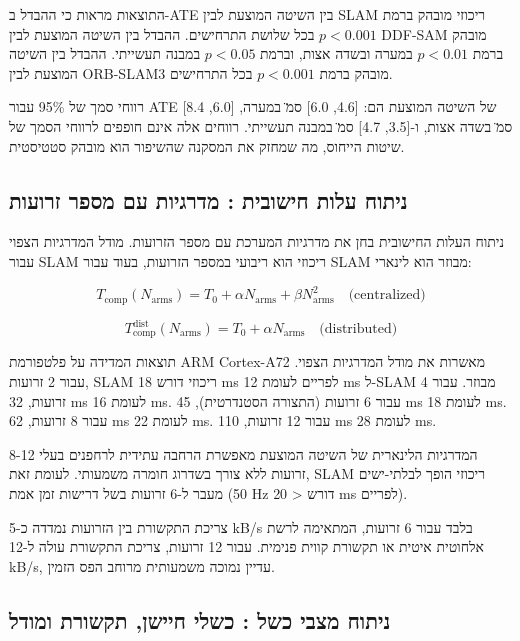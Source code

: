 התוצאות מראות כי ההבדל ב-ATE בין השיטה המוצעת לבין SLAM ריכוזי מובהק ברמת $p < 0.001$ בכל שלושת התרחישים. ההבדל בין השיטה המוצעת לבין DDF-SAM מובהק ברמת $p < 0.01$ במערה ובשדה אצות, וברמת $p < 0.05$ במבנה תעשייתי. ההבדל בין השיטה המוצעת לבין ORB-SLAM3 מובהק ברמת $p < 0.001$ בכל התרחישים.

רווחי סמך של 95\% עבור ATE של השיטה המוצעת הם: [4.6, 6.0] ס\"מ במערה, [6.0, 8.4] ס\"מ בשדה אצות, ו-[3.5, 4.7] ס\"מ במבנה תעשייתי. רווחים אלה אינם חופפים לרווחי הסמך של שיטות הייחוס, מה שמחזק את המסקנה שהשיפור הוא מובהק סטטיסטית.

\subsection{ניתוח עלות חישובית : מדרגיות עם מספר זרועות}
\label{sec:ch08_computational}

ניתוח העלות החישובית בחן את מדרגיות המערכת עם מספר הזרועות. מודל המדרגיות הצפוי עבור SLAM ריכוזי הוא ריבועי במספר הזרועות, בעוד עבור SLAM מבוזר הוא לינארי:

\begin{equation}
T_{\text{comp}}(N_{\text{arms}}) = T_0 + \alpha N_{\text{arms}} + \beta N_{\text{arms}}^2 \quad \text{(centralized)}
\label{eq:ch08_comp_centralized}
\end{equation}

\begin{equation}
T_{\text{comp}}^{\text{dist}}(N_{\text{arms}}) = T_0 + \alpha N_{\text{arms}} \quad \text{(distributed)}
\label{eq:ch08_comp_distributed}
\end{equation}

תוצאות המדידה על פלטפורמת ARM Cortex-A72 מאשרות את מודל המדרגיות הצפוי. עבור 2 זרועות, SLAM ריכוזי דורש 18 ms לפריים לעומת 12 ms ל-SLAM מבוזר. עבור 4 זרועות, 32 ms לעומת 16 ms. עבור 6 זרועות (התצורה הסטנדרטית), 45 ms לעומת 18 ms. עבור 8 זרועות, 62 ms לעומת 22 ms. עבור 12 זרועות, 110 ms לעומת 28 ms.

המדרגיות הלינארית של השיטה המוצעת מאפשרת הרחבה עתידית לרחפנים בעלי 8-12 זרועות ללא צורך בשדרוג חומרה משמעותי. לעומת זאת, SLAM ריכוזי הופך לבלתי-ישים מעבר ל-6 זרועות בשל דרישות זמן אמת (50 Hz דורש < 20 ms לפריים).

צריכת התקשורת בין הזרועות נמדדה כ-5 kB/s בלבד עבור 6 זרועות, המתאימה לרשת אלחוטית איטית או תקשורת קווית פנימית. עבור 12 זרועות, צריכת התקשורת עולה ל-12 kB/s, עדיין נמוכה משמעותית מרוחב הפס הזמין.

\subsection{ניתוח מצבי כשל : כשלי חיישן, תקשורת ומודל}
\label{sec:ch08_failure_modes}


